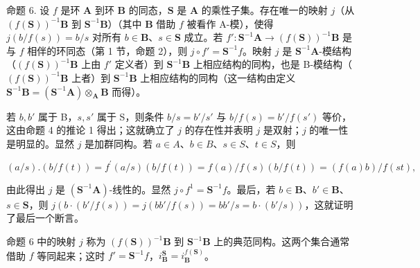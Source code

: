 命题 6. 设 \(f\) 是环 \(\mathbf{A}\) 到环 \(\mathbf{B}\) 的同态，\(\mathbf{S}\) 是 \(\mathbf{A}\) 的乘性子集。存在唯一的映射 \(j\)（从 \((f(\mathbf{S}))^{-1}\mathbf{B}\) 到 \(\mathbf{S}^{-1}\mathbf{B}\)）（其中 \(\mathbf{B}\) 借助 \(f\) 被看作 A-模），使得 \(j(b/f(s)) = b/s\) 对所有 \(b \in \mathbf{B}\)、\(s \in \mathbf{S}\) 成立。若 \(f': \mathbf{S}^{-1}\mathbf{A} \to (f(\mathbf{S}))^{-1}\mathbf{B}\) 是与 \(f\) 相伴的环同态（第 1 节，命题 2），则 \(j \circ f' = \mathbf{S}^{-1}f\)。映射 \(j\) 是 \(\mathbf{S}^{-1}\mathbf{A}\)-模结构（\((f(\mathbf{S}))^{-1}\mathbf{B}\) 上由 \(f'\) 定义者）到 \(\mathbf{S}^{-1}\mathbf{B}\) 上相应结构的同构，也是 B-模结构（\((f(\mathbf{S}))^{-1}\mathbf{B}\) 上者）到 \(\mathbf{S}^{-1}\mathbf{B}\) 上相应结构的同构（这一结构由定义 \(\mathbf{S}^{-1}\mathbf{B} = (\mathbf{S}^{-1}\mathbf{A}) \otimes_{\mathbf{A}} \mathbf{B}\) 而得）。

若 \(b, b'\) 属于 B，\(s, s'\) 属于 S，则条件 \(b / s = b' / s'\) 与 \(b / f(s) = b' / f(s')\) 等价，这由命题 4 的推论 1 得出；这就确立了 \(j\) 的存在性并表明 \(j\) 是双射；\(j\) 的唯一性是明显的。显然 \(j\) 是加群同构。若 \(a \in A\)、\(b \in B\)、\(s \in S\)、\(t \in S\)，则

\[
(a / s). (b / f (t)) = f ^ {\prime} (a / s) (b / f (t)) = f (a) / f (s) (b / f (t)) = (f (a) b) / f (s t),
\]

由此得出 \(j\) 是 \((\mathbf{S}^{-1}\mathbf{A})\)-线性的。显然 \(j \circ f^1 = \mathbf{S}^{-1}f\)。最后，若 \(b \in \mathbf{B}\)、\(b' \in \mathbf{B}\)、\(s \in \mathbf{S}\)，则 \(j(b \cdot (b'/f(s)) = j(bb'/f(s)) = bb'/s = b \cdot (b'/s))\)，这就证明了最后一个断言。

命题 6 中的映射 \(j\) 称为 \((f(\mathbf{S}))^{-1}\mathbf{B}\) 到 \(\mathbf{S}^{-1}\mathbf{B}\) 上的典范同构。这两个集合通常借助 \(f\) 等同起来；这时 \(f' = \mathbf{S}^{-1}f\)，\(i_{\mathbf{B}}^{\mathbf{S}} = i_{\mathbf{B}}^{f(\mathbf{S})}\)。

